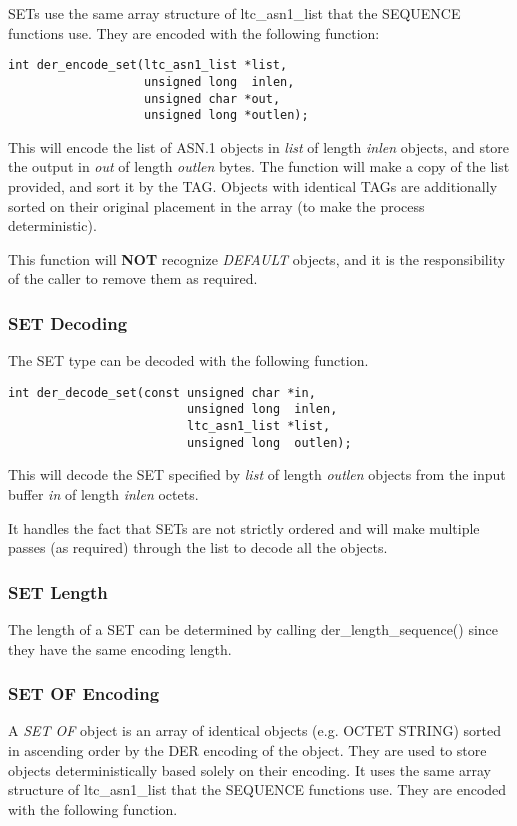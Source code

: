 \documentclass[synpaper]{book}
\begin{document}
SETs use the same array structure of ltc\_asn1\_list that the SEQUENCE functions use.  They are encoded with the following function:

\begin{verbatim}
int der_encode_set(ltc_asn1_list *list, 
                   unsigned long  inlen,
                   unsigned char *out,  
                   unsigned long *outlen);
\end{verbatim}            

This will encode the list of ASN.1 objects in \textit{list} of length \textit{inlen} objects, and store the output in \textit{out} of length \textit{outlen} bytes.  
The function will make a copy of the list provided, and sort it by the TAG.  Objects with identical TAGs are additionally sorted on their original placement in the 
array (to make the process deterministic).

This function will \textbf{NOT} recognize \textit{DEFAULT} objects, and it is the responsibility of the caller to remove them as required.

\subsubsection{SET Decoding}

The SET type can be decoded with the following function.

\begin{verbatim}
int der_decode_set(const unsigned char *in, 
                         unsigned long  inlen,
                         ltc_asn1_list *list, 
                         unsigned long  outlen);
\end{verbatim}

This will decode the SET specified by \textit{list} of length \textit{outlen} objects from the input buffer \textit{in} of length \textit{inlen} octets.

It handles the fact that SETs are not strictly ordered and will make multiple passes (as required) through the list to decode all the objects.  

\subsubsection{SET Length}
The length of a SET can be determined by calling der\_length\_sequence() since they have the same encoding length.

\subsubsection{SET OF Encoding}
A \textit{SET OF} object is an array of identical objects (e.g. OCTET STRING) sorted in ascending order by the DER encoding of the object.  They are 
used to store objects deterministically based solely on their encoding.  It uses the same array structure of ltc\_asn1\_list that the SEQUENCE functions
use.  They are encoded with the following function.
\end{document}

